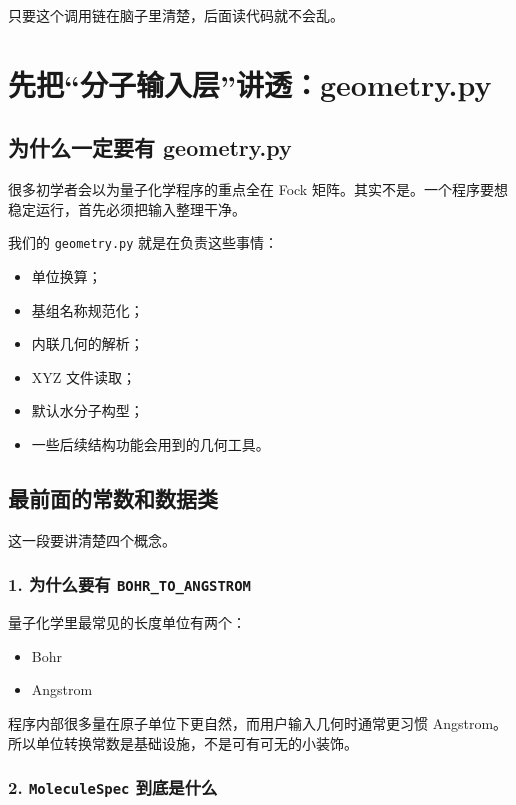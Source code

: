 \documentclass[UTF8,11pt,fontset=fandol]{ctexbook}
\begin{document}
只要这个调用链在脑子里清楚，后面读代码就不会乱。

\chapter{先把“分子输入层”讲透：geometry.py}

\section{为什么一定要有 geometry.py}

很多初学者会以为量子化学程序的重点全在 Fock 矩阵。其实不是。一个程序要想稳定运行，首先必须把输入整理干净。

我们的 \texttt{geometry.py} 就是在负责这些事情：
\begin{itemize}
  \item 单位换算；
  \item 基组名称规范化；
  \item 内联几何的解析；
  \item XYZ 文件读取；
  \item 默认水分子构型；
  \item 一些后续结构功能会用到的几何工具。
\end{itemize}

\section{最前面的常数和数据类}



这一段要讲清楚四个概念。

\subsection*{1. 为什么要有 \texttt{BOHR\_TO\_ANGSTROM}}

量子化学里最常见的长度单位有两个：
\begin{itemize}
  \item Bohr
  \item Angstrom
\end{itemize}

程序内部很多量在原子单位下更自然，而用户输入几何时通常更习惯 Angstrom。所以单位转换常数是基础设施，不是可有可无的小装饰。

\subsection*{2. \texttt{MoleculeSpec} 到底是什么}
\end{document}
